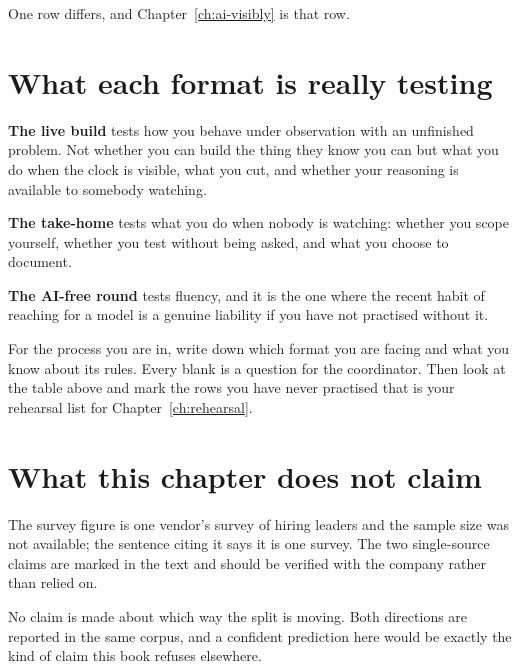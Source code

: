 One row differs, and Chapter~\ref{ch:ai-visibly} is that row.


\section{What each format is really testing}

\textbf{The live build} tests how you behave under observation with an
unfinished problem. Not whether you can build the thing \dash{} they know you
can \dash{} but what you do when the clock is visible, what you cut, and
whether your reasoning is available to somebody watching.

\textbf{The take-home} tests what you do when nobody is watching: whether you
scope yourself, whether you test without being asked, and what you choose to
document. 

\textbf{The AI-free round} tests fluency, and it is the one where the recent
habit of reaching for a model is a genuine liability if you have not practised
without it.


\begin{drill}
For the process you are in, write down which format you are facing and what you
know about its rules. Every blank is a question for the coordinator. Then look
at the table above and mark the rows you have never practised \dash{} that is
your rehearsal list for Chapter~\ref{ch:rehearsal}.
\end{drill}

\section*{What this chapter does not claim}

The survey figure is one vendor's survey of hiring leaders and the sample size
was not available; the sentence citing it says it is one survey. The two
single-source claims are marked in the text and should be verified with the
company rather than relied on.

No claim is made about which way the split is moving. Both directions are
reported in the same corpus, and a confident prediction here would be exactly
the kind of claim this book refuses elsewhere.
